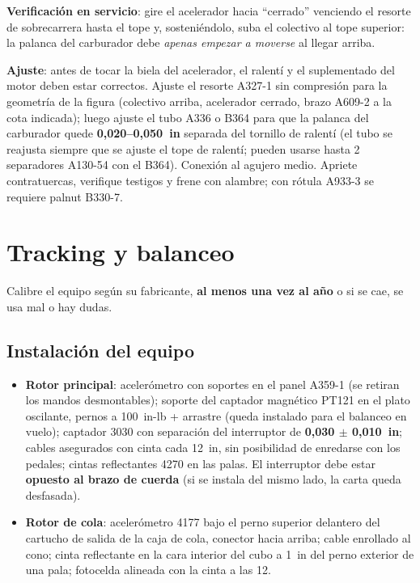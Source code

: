 \textbf{Verificación en servicio}: gire el acelerador hacia ``cerrado'' venciendo el resorte de sobrecarrera hasta el tope y, sosteniéndolo, suba el colectivo al tope superior: la palanca del carburador debe \emph{apenas empezar a moverse} al llegar arriba.

\textbf{Ajuste}: antes de tocar la biela del acelerador, el ralentí y el suplementado del motor deben estar correctos. Ajuste el resorte A327-1 sin compresión para la geometría de la figura (colectivo arriba, acelerador cerrado, brazo A609-2 a la cota indicada); luego ajuste el tubo A336 o B364 para que la palanca del carburador quede \textbf{0,020--0,050~in} separada del tornillo de ralentí (el tubo se reajusta siempre que se ajuste el tope de ralentí; pueden usarse hasta 2 separadores A130-54 con el B364). Conexión al agujero medio. Apriete contratuercas, verifique testigos y frene con alambre; con rótula A933-3 se requiere palnut B330-7.

\section{Tracking y balanceo}

\begin{nota}
Calibre el equipo según su fabricante, \textbf{al menos una vez al año} o si se cae, se usa mal o hay dudas.
\end{nota}

\subsection{Instalación del equipo}

\begin{itemize}
\item \textbf{Rotor principal}: acelerómetro con soportes en el panel A359-1 (se retiran los mandos desmontables); soporte del captador magnético PT121 en el plato oscilante, pernos a 100~in-lb + arrastre (queda instalado para el balanceo en vuelo); captador 3030 con separación del interruptor de \textbf{0,030 $\pm$ 0,010~in}; cables asegurados con cinta cada 12~in, sin posibilidad de enredarse con los pedales; cintas reflectantes 4270 en las palas. El interruptor debe estar \textbf{opuesto al brazo de cuerda} (si se instala del mismo lado, la carta queda desfasada).
\item \textbf{Rotor de cola}: acelerómetro 4177 bajo el perno superior delantero del cartucho de salida de la caja de cola, conector hacia arriba; cable enrollado al cono; cinta reflectante en la cara interior del cubo a 1~in del perno exterior de una pala; fotocelda alineada con la cinta a las 12.
\end{itemize}


